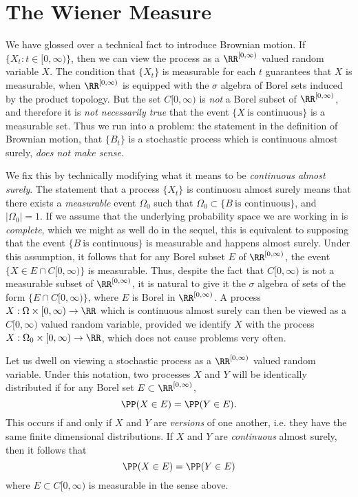 \section{The Wiener Measure}

We have glossed over a technical fact to introduce Brownian motion. If $\{ X_t : t \in [0,\infty) \}$, then we can view the process as a $\RR^{[0,\infty)}$ valued random variable $X$. The condition that $\{ X_t \}$ is measurable for each $t$ guarantees that $X$ is measurable, when $\RR^{[0,\infty)}$ is equipped with the $\sigma$ algebra of Borel sets induced by the product topology. But the set $C[0,\infty)$ is \emph{not} a Borel subset of $\RR^{[0,\infty)}$, and therefore it is \emph{not necessarily true} that the event $\{ X\ \text{is continuous} \}$ is a measurable set. Thus we run into a problem: the statement in the definition of Brownian motion, that $\{ B_t \}$ is a stochastic process which is continuous almost surely, \emph{does not make sense}.

We fix this by technically modifying what it means to be \emph{continuous almost surely}. The statement that a process $\{ X_t \}$ is continuosu almost surely means that there exists a \emph{measurable} event $\Omega_0$ such that $\Omega_0 \subset \{ B\ \text{is continuous} \}$, and $|\Omega_0| = 1$. If we assume that the underlying probability space we are working in is \emph{complete}, which we might as well do in the sequel, this is equivalent to supposing that the event $\{ B\ \text{is continuous} \}$ is measurable and happens almost surely. Under this assumption, it follows that for any Borel subset $E$ of $\RR^{[0,\infty)}$, the event $\{ X \in E \cap C[0,\infty) \}$ is measurable. Thus, despite the fact that $C[0,\infty)$ is not a measurable subset of $\RR^{[0,\infty)}$, it is natural to give it the $\sigma$ algebra of sets of the form $\{ E \cap C[0,\infty) \}$, where $E$ is Borel in $\RR^{[0,\infty)}$. A process $X: \Omega \times [0,\infty) \to \RR$ which is continuous almost surely can then be viewed as a $C[0,\infty)$ valued random variable, provided we identify $X$ with the process $X: \Omega_0 \times [0,\infty) \to \RR$, which does not cause problems very often.

Let us dwell on viewing a stochastic process as a $\RR^{[0,\infty)}$ valued random variable. Under this notation, two processes $X$ and $Y$ will be identically distributed if for any Borel set $E \subset \RR^{[0,\infty)}$,
%
\[ \PP(X \in E) = \PP(Y \in E). \]
%
This occurs if and only if $X$ and $Y$ are \emph{versions} of one another, i.e. they have the same finite dimensional distributions. If $X$ and $Y$ are \emph{continuous} almost surely, then it follows that
%
\[ \PP(X \in E) = \PP(Y \in E) \]
%
where $E \subset C[0,\infty)$ is measurable in the sense above.

